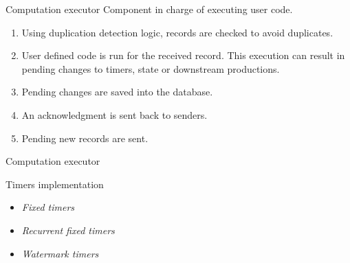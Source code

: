 \documentclass[10pt]{beamer}
\begin{document}
\begin{frame}[fragile]{Computation executor}
  Component in charge of executing user code.
  \begin{enumerate}
  \item Using duplication detection logic, records are checked to avoid duplicates.
  \item User defined code is run for the received record. This execution can
    result in pending changes to timers, state or downstream productions.
  \item Pending changes are saved into the database.
  \item An acknowledgment is sent back to senders.
  \item Pending new records are sent.
  \end{enumerate}
\end{frame}


\begin{frame}[fragile]{Computation executor}
\tx
\end{frame}

\begin{frame}[fragile]{Timers implementation}
  \begin{itemize}
  \item \textit{Fixed timers}
  \item \textit{Recurrent fixed timers}
  \item \textit{Watermark timers}
  \end{itemize}
\end{frame}
\end{document}
